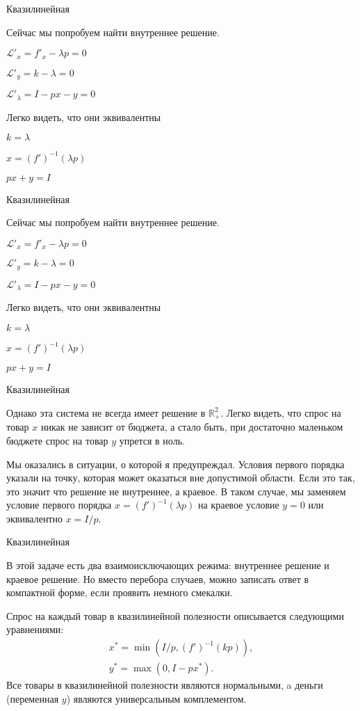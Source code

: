 \documentclass{beamer}
\begin{document}
\begin{frame}{Квазилинейная}

Сейчас мы попробуем найти внутреннее решение.

$\mathcal{L}'_x = f'_x - \lambda p = 0$

$\mathcal{L}'_y = k - \lambda = 0$

$\mathcal{L}'_{\lambda} = I - p x - y= 0$

Легко видеть, что они эквивалентны

$k = \lambda$

$x = (f')^{-1}(\lambda p)$

$px + y = I$

\end{frame}

\begin{frame}{Квазилинейная}

Сейчас мы попробуем найти внутреннее решение.

$\mathcal{L}'_x = f'_x - \lambda p = 0$

$\mathcal{L}'_y = k - \lambda = 0$

$\mathcal{L}'_{\lambda} = I - p x - y= 0$

Легко видеть, что они эквивалентны

$k = \lambda$

$x = (f')^{-1}(\lambda p)$

$px + y = I$

\end{frame}

\begin{frame}{Квазилинейная}

Однако эта система не всегда имеет решение в $\mathbb{R}^2_{+}$. Легко видеть, что спрос на товар $x$ никак не зависит от бюджета, а стало быть, при достаточно маленьком бюджете спрос на товар $y$ упрется в ноль.

Мы оказались в ситуации, о которой я предупреждал. Условия первого порядка указали на точку, которая может оказаться вне допустимой области. Если это так, это значит что решение не внутреннее, а краевое. В таком случае, мы заменяем условие первого порядка  $x = (f')^{-1}(\lambda p)$ на краевое условие $y=0$ или эквивалентно $x = I/p$.

\end{frame}


\begin{frame}{Квазилинейная}

В этой задаче есть два взаимоисключающих режима: внутреннее решение и краевое решение. Но вместо перебора случаев, можно записать ответ в компактной форме, если проявить немного смекалки.

Спрос на каждый товар в квазилинейной полезности описывается следующими уравнениями:
\begin{gather*}
x^{\ast} = \min (I/p, (f')^{-1}(k p)), \\
y^{\ast} = \max (0, I-px^{\ast}).
\end{gather*}
Все товары в квазилинейной полезности являются нормальными, a деньги (переменная $y$) являются универсальным комплементом.
\end{frame}
\end{document}
